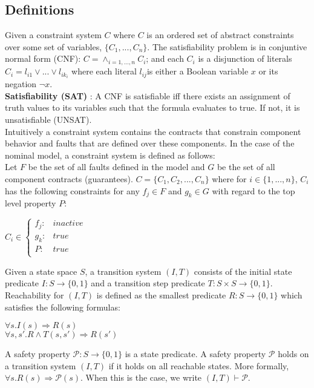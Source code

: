 \subsection{Definitions} 

Given a constraint system $C$ where $C$ is an ordered set of abstract constraints over some set of variables, $\{C_1, ..., C_n\}$. The satisfiability problem is in conjuntive normal form (CNF): $C = \land_{i=1,...,n} C_i$; and each $C_i$ is a disjunction of literals $C_i = l_{i1} \lor ... \lor l_{ik_i}$ where each literal $ l_{ij}$is either a Boolean variable $x$ or its negation $\neg x$. \\

\textbf{Satisfiability (SAT)} : A CNF is satisfiable iff there exists an assignment of truth values to its variables such that the formula evaluates to true. If not, it is unsatisfiable (UNSAT). \\

Intuitively a constraint system contains the contracts that constrain component behavior and faults that are defined over these components. In the case of the nominal model, a constraint system is defined as follows: \\

Let $F$ be the set of all faults defined in the model and $G$ be the set of all component contracts (guarantees). $C = \{C_1,C_2,...,C_n\}$ where for $i \in \{1,...,n\}$, $C_i$ has the following constraints for any $f_j \in F$ and $g_k \in G$ with regard to the top level property $P$: \\
\begin{center}
$C_i \in \left\{ \begin{array}{ll}
	f_j :&  inactive\\
	g_k :& true\\
	P :& true\\
\end{array}\right.$	
\end{center}

Given a state space $S$, a transition system $(I,T)$ consists of the initial state predicate $I : S \rightarrow \{0,1\}$ and a transition step predicate $T : S \times S \rightarrow \{0,1\}$. Reachability for $(I,T)$ is defined as the smallest predicate $R : S \rightarrow \{0,1\}$ which satisfies the following formulas:
\begin{center}
$\forall s. I(s) \Rightarrow R(s)$\\
$\forall s, s' .  R \land T(s,s') \Rightarrow R(s')$\\
\end{center}
A safety property $\mathcal{P} : S \to \{0,1\}$ is a state predicate. A safety property $\mathcal{P}$ holds on a transition system $(I,T)$ if it holds on all reachable states. More formally, $\forall s . R(s) \Rightarrow \mathcal{P}(s)$. When this is the case, we write $(I,T) \vdash\mathcal{P}$. 

